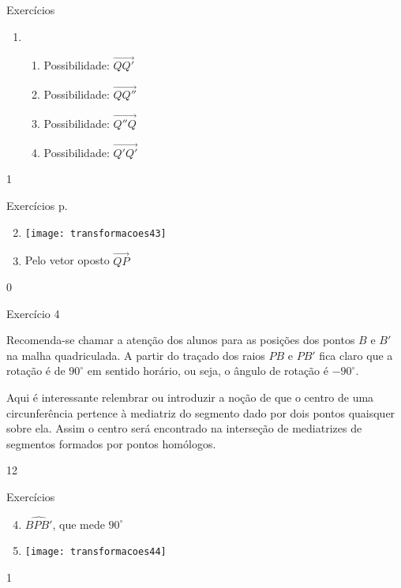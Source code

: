 \begin{answer}{Exercícios}
{\exerciselist
\begin{enumerate}
\item 
\begin{enumerate}
\item Possibilidade: $\overrightarrow{QQ'}$
\item Possibilidade: $\overrightarrow{QQ''}$
\item Possibilidade: $\overrightarrow{Q''Q}$
\item Possibilidade: $\overrightarrow{Q'Q'}$
\end{enumerate}
\end{enumerate}
}{1}
\end{answer}
\marginpar{\vspace{-.75em}}
\begin{answer}{Exercícios p. \pageref{transformacoes-exercise2}}
{\exerciselist
\begin{enumerate}\setcounter{enumi}{1}
\item {}
{
\texttt{[image: transformacoes43]}
}
\item Pelo vetor oposto $\overrightarrow{QP}$
\end{enumerate}
}{0}
\end{answer}
\begin{sugestions}{Exercício 4}
{
Recomenda-se chamar a atenção dos alunos para as posições dos pontos $B$ e $B'$ na malha quadriculada. A partir do traçado dos raios $PB$ e $PB'$ fica claro que a rotação é de $90^{\circ}$ em sentido horário, ou seja, o ângulo de rotação é $-90^{\circ}$.


Aqui é interessante relembrar ou introduzir a noção de que o centro de uma circunferência pertence à mediatriz do segmento dado por dois pontos quaisquer sobre ela. Assim o centro será encontrado na interseção de mediatrizes de segmentos formados por pontos homólogos.
}{1}{2}
\end{sugestions}
\begin{answer}{Exercícios}
{\exerciselist
\begin{enumerate}\setcounter{enumi}{3}
\item $\hat{BPB'}$, que mede $90^{\circ}$

\item {}
{
\texttt{[image: transformacoes44]}
}
\end{enumerate}
}{1}
\end{answer}
